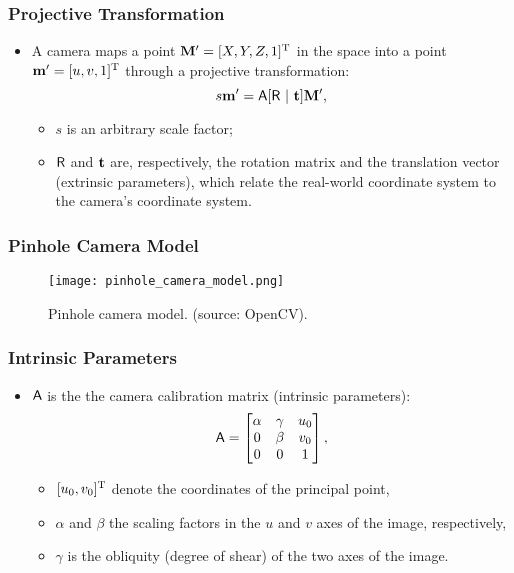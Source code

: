 \documentclass{beamer}
\begin{document}
		\begin{frame}\frametitle{Projective Transformation}
			\begin{itemize}
			 \item  A camera maps a point $\mathbf{M}' = [X,Y,Z,1]^{\mathrm{T}}$ in the space into a point $\mathbf{m}' = [u,v,1]^{\mathrm{T}}$ through a projective transformation:
			 \begin{equation}
			\label{eq:projection}
			s\mathbf{m}' = \mathsf{A}[\mathsf{R}~|~\mathbf{t}]\mathbf{M}',
			\end{equation}
			\begin{itemize}
			 \item $s$ is an arbitrary scale factor;
			 \item $\mathsf{R}$ and $\mathbf{t}$ are, respectively, the rotation matrix and the translation vector (extrinsic parameters), which relate the real-world coordinate system to the camera's coordinate system.
			\end{itemize}
			\end{itemize}
		\end{frame}

		\begin{frame}\frametitle{Pinhole Camera Model}
			\begin{figure}[htb!]
				\center
				\texttt{[image: pinhole\_camera\_model.png]}
				\label{fig:keypts_1} %
				\caption{Pinhole camera model. (source: OpenCV).}
				\vspace{-3.5mm}
				\label{fig:undistort}
			\end{figure}
		\end{frame}


		\begin{frame}
			\frametitle{Intrinsic Parameters}
			\begin{itemize}
			 \item $\mathsf{A}$ is the the camera calibration matrix (intrinsic parameters):
			 \begin{equation}
			\mathsf{A} =
			\begin{bmatrix}
			\alpha & \gamma & u_0\\
			0 & \beta  & v_0\\
			0 &     0  & 1\\
			\end{bmatrix},
			\end{equation}
			\begin{itemize}
			 \item $[u_0,v_0]^{\mathrm{T}}$ denote the coordinates of the principal point,
			 \item $\alpha$ and $\beta$ the scaling factors in the $ u $ and $ v $ axes of the image, respectively,
			 \item $\gamma$ is the obliquity (degree of shear) of the two axes of the image.
			\end{itemize}
			\end{itemize}
		\end{frame}
\end{document}
